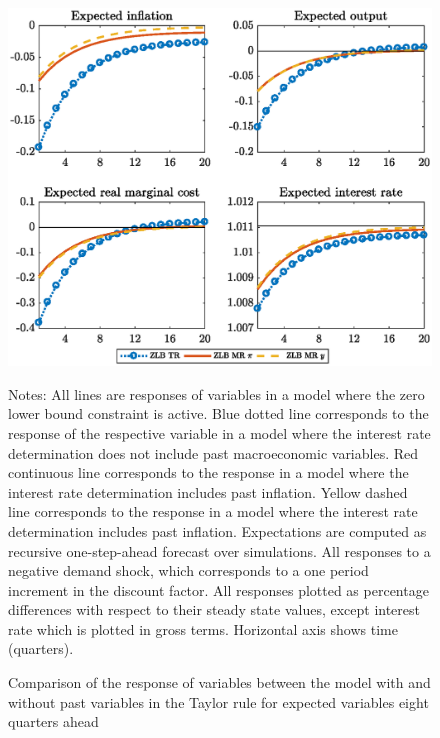 \documentclass[11pt]{article}
\numberwithin{equation}{section}
\begin{document}
\begin{figure}[H]
	\centering
	\caption{Comparison of the response of variables between the model with and without past variables in the Taylor rule for expected variables eight quarters ahead}\label{fig:irfCompExp8_pref}
	\includegraphics[scale=.6]{irfCompExp8_pref}
	\begin{minipage}{\linewidth}
    	\vspace{1mm}
	\footnotesize{{\sc Notes:} All lines are responses of variables in a model where the zero lower bound constraint is active. Blue dotted line corresponds to the response of the respective variable in a model where the interest rate determination does not include past macroeconomic variables. Red continuous line corresponds to the response in a model where the interest rate determination includes past inflation. Yellow dashed line corresponds to the response in a model where the interest rate determination includes past inflation. Expectations are computed as recursive one-step-ahead forecast over simulations. All responses to a negative demand shock, which corresponds to a one period increment in the discount factor. All responses plotted as percentage differences with respect to their steady state values, except interest rate which is plotted in gross terms. Horizontal axis shows time (quarters).}
	\end{minipage}
\end{figure}
\end{document}
